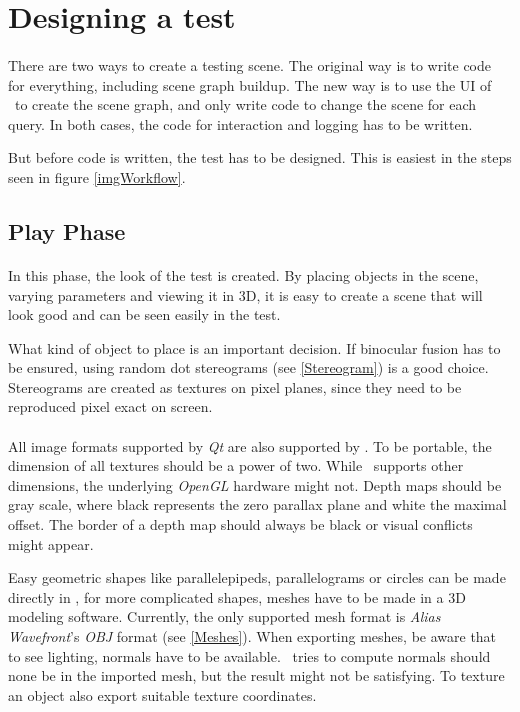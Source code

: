 \section{Designing a test}
\paragraph{}
There are two ways to create a testing scene.
The original way is to write code for everything, including scene graph buildup.
The new way is to use the UI of \ER\ to create the scene graph,
and only write code to change the scene for each query.
In both cases, the code for interaction and logging has to be written.

But before code is written, the test has to be designed.
This is easiest in the steps seen in figure \ref{imgWorkflow}.


\subsection{Play Phase}
\paragraph{}
In this phase, the look of the test is created.
By placing objects in the scene, varying parameters and viewing it in 3D, it is easy to create a scene that will look good and can be seen easily in the test.

What kind of object to place is an important decision.
If binocular fusion has to be ensured, using random dot stereograms (see \ref{Stereogram}) is a good choice.
Stereograms are created as textures on pixel planes, since they need to be reproduced pixel exact on screen.

\paragraph{}
All image formats supported by \textit{Qt} are also supported by \ER.
To be portable, the dimension of all textures should be a power of two.
While \ER\ supports other dimensions, the underlying \textit{OpenGL} hardware might not.
Depth maps should be gray scale, where black represents the zero parallax plane and white the maximal offset.
The border of a depth map should always be black or visual conflicts might appear.

Easy geometric shapes like parallelepipeds, parallelograms or circles can be made directly in \ER,
for more complicated shapes, meshes have to be made in a 3D modeling software.
Currently, the only supported mesh format is \textit{Alias Wavefront}'s \textit{OBJ} format (see \ref{Meshes}).
When exporting meshes, be aware that to see lighting, normals have to be available.
\ER\ tries to compute normals should none be in the imported mesh, but the result might not be satisfying.
To texture an object also export suitable texture coordinates.

